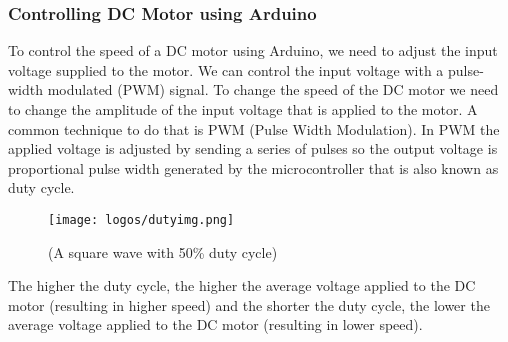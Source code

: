 \documentclass[table]{rapportCS}
\begin{document}
\subsubsection{Controlling DC Motor using Arduino}\label{sec:contdcmotor}

To control the speed of a DC motor using Arduino, we need to adjust the input voltage supplied to the motor. 
We can control the input voltage with a pulse-width modulated (PWM) signal.
To change the speed of the DC motor we need to change the amplitude of the input voltage that is applied to the motor.
A common technique to do that is PWM (Pulse Width Modulation). In PWM the applied voltage is adjusted by sending a series of pulses so the output voltage is proportional pulse width generated by the microcontroller that is also known as duty cycle.
\begin{figure}[h]
    \centering
    \texttt{[image: logos/dutyimg.png]}
    \caption{(A square wave with 50\% duty cycle)
}
    \label{fig:outlinemindmap}
\end{figure}
The higher the duty cycle, the higher the average voltage applied to the DC motor (resulting in higher speed) and the shorter the duty cycle, the lower the average voltage applied to the DC motor (resulting in lower speed).
\end{document}
